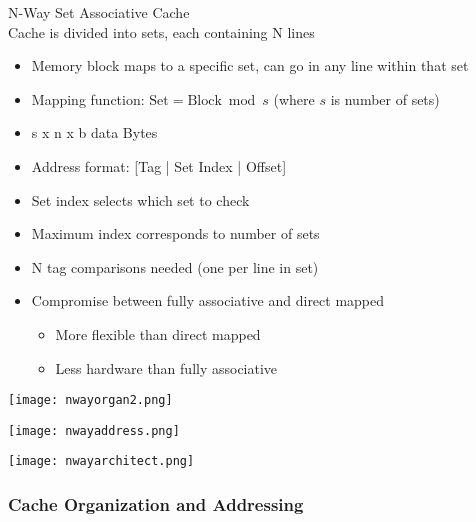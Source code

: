 \begin{concept}{N-Way Set Associative Cache}\\
    Cache is divided into sets, each containing N lines
\begin{itemize}
    \item Memory block maps to a specific set, can go in any line within that set
    \item Mapping function: $\text{Set} = \text{Block} \bmod s$ (where $s$ is number of sets)
    \item s x n x b data Bytes
    \item Address format: [Tag | Set Index | Offset]
    \item Set index selects which set to check
    \item Maximum index corresponds to number of sets
    \item N tag comparisons needed (one per line in set)
    \item Compromise between fully associative and direct mapped 
    \begin{itemize}
        \item More flexible than direct mapped
        \item Less hardware than fully associative
    \end{itemize}
\end{itemize}

\begin{center}
    \texttt{[image: nwayorgan2.png]}

\texttt{[image: nwayaddress.png]}



\texttt{[image: nwayarchitect.png]}
\end{center}
\end{concept}






\subsubsection{Cache Organization and Addressing}





